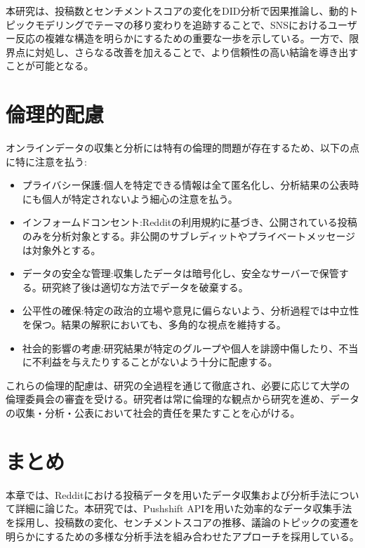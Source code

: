 \documentclass[11pt, a4j]{jreport}
\begin{document}
    本研究は、投稿数とセンチメントスコアの変化をDID分析で因果推論し、動的トピックモデリングでテーマの移り変わりを追跡することで、SNSにおけるユーザー反応の複雑な構造を明らかにするための重要な一歩を示している。一方で、限界点に対処し、さらなる改善を加えることで、より信頼性の高い結論を導き出すことが可能となる。

    \section{倫理的配慮}
    オンラインデータの収集と分析には特有の倫理的問題が存在するため、以下の点に特に注意を払う:

    \begin{itemize}
        \item プライバシー保護:個人を特定できる情報は全て匿名化し、分析結果の公表時にも個人が特定されないよう細心の注意を払う。

        \item インフォームドコンセント:Redditの利用規約に基づき、公開されている投稿のみを分析対象とする。非公開のサブレディットやプライベートメッセージは対象外とする。

        \item データの安全な管理:収集したデータは暗号化し、安全なサーバーで保管する。研究終了後は適切な方法でデータを破棄する。

        \item 公平性の確保:特定の政治的立場や意見に偏らないよう、分析過程では中立性を保つ。結果の解釈においても、多角的な視点を維持する。

        \item 社会的影響の考慮:研究結果が特定のグループや個人を誹謗中傷したり、不当に不利益を与えたりすることがないよう十分に配慮する。
    \end{itemize}

    これらの倫理的配慮は、研究の全過程を通じて徹底され、必要に応じて大学の倫理委員会の審査を受ける。研究者は常に倫理的な観点から研究を進め、データの収集・分析・公表において社会的責任を果たすことを心がける。

    \section{まとめ}
    本章では、Redditにおける投稿データを用いたデータ収集および分析手法について詳細に論じた。本研究では、Pushshift APIを用いた効率的なデータ収集手法を採用し、投稿数の変化、センチメントスコアの推移、議論のトピックの変遷を明らかにするための多様な分析手法を組み合わせたアプローチを採用している。
\end{document}
